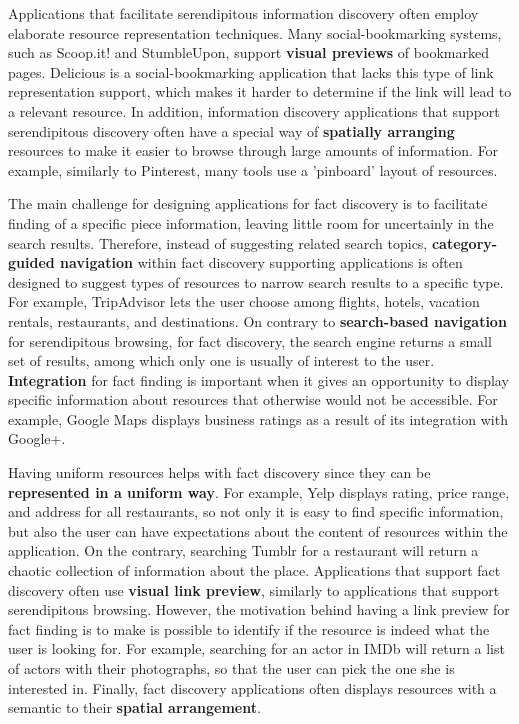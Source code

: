 \documentclass{casconpaper}
\begin{document}
{{Applications that facilitate serendipitous information discovery often employ elaborate resource representation techniques. Many social-bookmarking systems, such as Scoop.it! and StumbleUpon, support \textbf{visual previews} of bookmarked pages. Delicious is a social-bookmarking application that lacks this type of link representation support, which makes it harder to determine if the link will lead to a relevant resource. In addition, information discovery applications that support serendipitous discovery often have a special way of \textbf{spatially arranging} resources to make it easier to browse through large amounts of information. For example, similarly to Pinterest, many tools use a 'pinboard' layout of resources.

The main challenge for designing applications for fact discovery is to facilitate finding of a specific piece information, leaving little room for uncertainly in the search results. Therefore, instead of suggesting related search topics, \textbf{category-guided navigation} within fact discovery supporting applications is often designed to suggest types of resources to narrow search results to a specific type. For example, TripAdvisor lets the user choose among flights, hotels, vacation rentals, restaurants, and destinations. On contrary to \textbf{search-based navigation} for serendipitous browsing, for fact discovery, the search engine returns a small set of results, among which only one is usually of interest to the user. \textbf{Integration} for fact finding is important when it gives an opportunity to display specific information about resources that otherwise would not be accessible. For example, Google Maps displays business ratings as a result of its integration with Google+.  

Having uniform resources helps with fact discovery since they can be \textbf{represented in a uniform way}. For example, Yelp displays rating, price range, and address for all restaurants, so not only it is easy to find specific information, but also the user can have expectations about the content of resources within the application. On the contrary, searching Tumblr for a restaurant will return a chaotic collection of information about the place.  Applications that support fact discovery often use \textbf{visual link preview}, similarly to applications that support serendipitous browsing. However, the motivation behind having a link preview for fact finding is to make is possible to identify if the resource is indeed what the user is looking for. For example, searching for an actor in IMDb will return a list of actors with their photographs, so that the user can pick the one she is interested in. Finally, fact discovery applications often displays resources with a semantic to their \textbf{spatial arrangement}. 

}}
\end{document}

